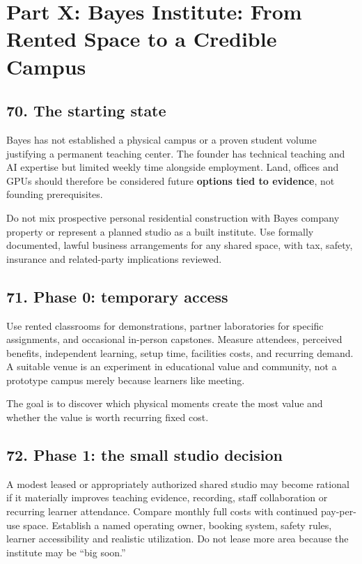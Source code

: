 \section*{Part X: Bayes Institute: From Rented Space to a Credible Campus}


\subsection{70. The starting state}

Bayes has not established a physical campus or a proven student volume justifying a permanent teaching center. The founder has technical teaching and AI expertise but limited weekly time alongside employment. Land, offices and GPUs should therefore be considered future \textbf{options tied to evidence}, not founding prerequisites.

Do not mix prospective personal residential construction with Bayes company property or represent a planned studio as a built institute. Use formally documented, lawful business arrangements for any shared space, with tax, safety, insurance and related-party implications reviewed.


\subsection{71. Phase 0: temporary access}

Use rented classrooms for demonstrations, partner laboratories for specific assignments, and occasional in-person capstones. Measure attendees, perceived benefits, independent learning, setup time, facilities costs, and recurring demand. A suitable venue is an experiment in educational value and community, not a prototype campus merely because learners like meeting.

The goal is to discover which physical moments create the most value and whether the value is worth recurring fixed cost.


\subsection{72. Phase 1: the small studio decision}

A modest leased or appropriately authorized shared studio may become rational if it materially improves teaching evidence, recording, staff collaboration or recurring learner attendance. Compare monthly full costs with continued pay-per-use space. Establish a named operating owner, booking system, safety rules, learner accessibility and realistic utilization. Do not lease more area because the institute may be ``big soon.''


